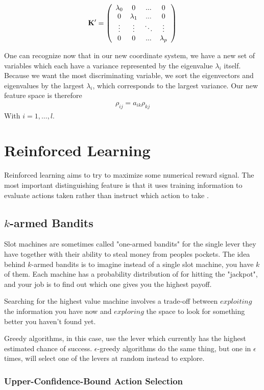 $$\bf{K}' = \left(
{\begin{array}{cccc}
\lambda_0 & 0 &...&0 \\
0 & \lambda_1 & ...&0\\
\vdots & \vdots &\ddots & \vdots \\
0 & 0 & ... &\lambda_p
\end{array}}
\right)
$$

One can recognize now that in our new coordinate system, we have a new set of variables which each have a variance represented by the eigenvalue $\lambda_i$ itself. Because we want the most discriminating variable, we sort the eigenvectors and eigenvalues by the largest $\lambda_i$, which corresponds to the largest variance. Our new feature space is therefore
\begin{align}
	\rho_{ij} = a_{ik}\rho_{kj}
\end{align}
With $i=1,\dots,l$.


\section{Reinforced Learning}
Reinforced learning aims to try to maximize some numerical reward signal. The most important distinguishing feature is that it uses training information to evaluate actions taken rather than instruct which action to take \cite{sutton}.


\subsection{$k$-armed Bandits}
Slot machines are sometimes called "one-armed bandits" for the single lever they have together with their ability to steal money from peoples pockets. The idea behind $k$-armed bandits is to imagine instead of a single slot machine, you have $k$ of them. Each machine has a probability distribution of for hitting the "jackpot", and your job is to find out which one gives you the highest payoff.

Searching for the highest value machine involves a trade-off between $exploiting$ the information you have now and $exploring$ the space to look for something better you haven't found yet.

Greedy algorithms, in this case, use the lever which currently has the highest estimated chance of success. $\epsilon$-greedy algorithms do the same thing, but one in $\epsilon$ times, will select one of the levers at random instead to explore.


\subsubsection{Upper-Confidence-Bound Action Selection}

